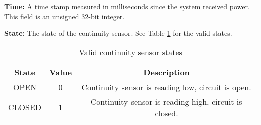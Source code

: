 \textbf{Time:} A time stamp measured in milliseconds since the system received power. This field is an unsigned 32-bit
integer.

\textbf{State:} The state of the continuity sensor. See Table \ref{tbl:continuity_states} for the valid states. 

\begin{table}[H]
    \centering
    \begin{tabular}{| c | c | c |}
        \hline
        State & Value & Description                    \\
        \hline
        OPEN   & 0     & Continuity sensor is reading low, circuit is open. \\
        \hline
        CLOSED    & 1     & Continuity sensor is reading high, circuit is closed.  \\
        \hline
    \end{tabular}
    \caption{Valid continuity sensor states}
    \label{tbl:continuity_states}
\end{table}
